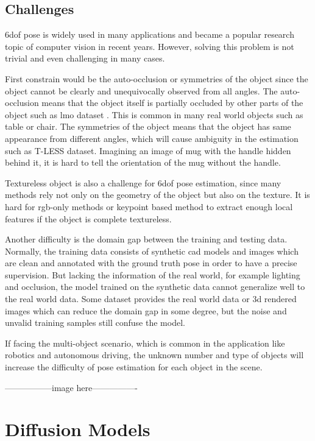 \documentclass[12pt,DIV14,BCOR12mm,a4paper,footinclude=false,headinclude,parskip=half-,twoside,openright,cleardoublepage=empty,toc=index,bibliography=totoc,listof=totoc]{scrreprt}
\numberwithin{equation}{chapter}
\begin{document}
\subsection{Challenges}
\gls{6dof} pose is widely used in many applications and became a popular research topic of computer vision in recent years. However, solving this problem is not trivial and even challenging in many cases.

First constrain would be the auto-occlusion or symmetries of the object since the object cannot be clearly and unequivocally observed from all angles\cite{maru2022}. The auto-occlusion means that the object itself is partially occluded by other parts of the object such as \gls{lmo} dataset \cite{dataV4MUMX2020}. This is common in many real world objects such as table or chair. The symmetries of the object means that the object has same appearance from different angles, which will cause ambiguity in the estimation such as T-LESS dataset\cite{hodan2017tless}. Imagining an image of mug with the handle hidden behind it, it is hard to tell the orientation of the mug without the handle.

Textureless object is also a challenge for \gls{6dof} pose estimation, since many methods rely not only on the geometry of the object but also on the texture. It is hard for \gls{rgb}-only methods\cite{kendall2016posenet} or keypoint based method\cite{pavlakos20176dof} to extract enough local features if the object is complete textureless.

Another difficulty is the domain gap between the training and testing data. Normally, the training data consists of synthetic \gls{cad} models and images which are clean and annotated with the ground truth pose in order to have a precise supervision. But lacking the information of the real world, for example lighting and occlusion, the model trained on the synthetic data cannot generalize well to the real world data. Some dataset provides the real world data or \gls{3d} rendered images which can reduce the domain gap in some degree\cite{hodan2019photorealistic}, but the noise and unvalid training samples still confuse the model.

If facing the multi-object scenario, which is common in the application like robotics and autonomous driving, the unknown number and type of objects will increase the difficulty of pose estimation for each object in the scene.

-----------------image here----------------

\section{Diffusion Models}
\end{document}
